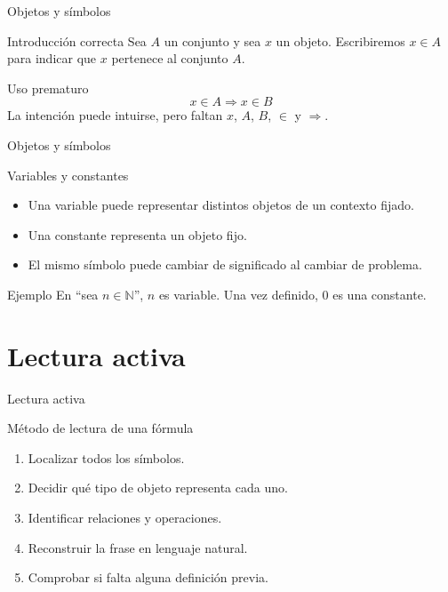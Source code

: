 \documentclass[aspectratio=169,11pt]{beamer}
\newcommand{\N}{\mathbb{N}}
\begin{document}
\begin{frame}{Objetos y símbolos}
\begin{block}{Introducción correcta}
Sea \(A\) un conjunto y sea \(x\) un objeto. Escribiremos \(x\in A\) para indicar
que \(x\) pertenece al conjunto \(A\).
\end{block}

\begin{block}{Uso prematuro}
\[
  x\in A \Rightarrow x\in B
\]
La intención puede intuirse, pero faltan \(x\), \(A\), \(B\), \(\in\) y \(\Rightarrow\).
\end{block}
\end{frame}

\begin{frame}{Objetos y símbolos}
\begin{block}{Variables y constantes}
\begin{itemize}
  \item Una variable puede representar distintos objetos de un contexto fijado.
  \item Una constante representa un objeto fijo.
  \item El mismo símbolo puede cambiar de significado al cambiar de problema.
\end{itemize}
\end{block}

\begin{exampleblock}{Ejemplo}
En ``sea \(n\in\N\)'', \(n\) es variable. Una vez definido, \(0\) es una constante.
\end{exampleblock}
\end{frame}

\section{Lectura activa}

\begin{frame}{Lectura activa}
\begin{block}{Método de lectura de una fórmula}
\begin{enumerate}
  \item Localizar todos los símbolos.
  \item Decidir qué tipo de objeto representa cada uno.
  \item Identificar relaciones y operaciones.
  \item Reconstruir la frase en lenguaje natural.
  \item Comprobar si falta alguna definición previa.
\end{enumerate}
\end{block}
\end{frame}
\end{document}
